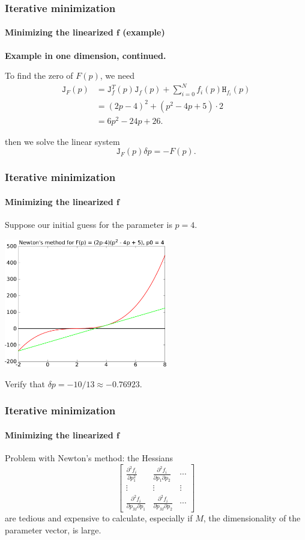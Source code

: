 \documentclass[aspectratio=169]{beamer}
\renewcommand{\vec}[1]{\boldsymbol{#1}}
\newcommand{\mat}[1]{\mathtt{#1}}
\begin{document}
\begin{frame}
\frametitle{Iterative minimization}
\framesubtitle{Minimizing the linearized $\vec{f}$ (example)}

\textbf{Example in one dimension, continued.}

\medskip

To find the zero of $F(p)$, we need
\begin{align*}
\mat{J}_F(p) & = \mat{J}^T_f(p)\mat{J}_f(p) +
                     \sum_{i=0}^N f_i(p)\mat{H}_{f_i}(p) \\
             & = (2p-4)^2 + (p^2-4p+5)\cdot 2 \\
             & = 6p^2-24p+26 .
\end{align*}

then we solve the linear system
$$ \mat{J}_F(p) \delta p = -F(p) .$$

\end{frame}


\begin{frame}
\frametitle{Iterative minimization}
\framesubtitle{Minimizing the linearized $\vec{f}$}

Suppose our initial guess for the parameter is $p = 4$.

\bigskip

\centerline{\includegraphics[width=2.8in]{fig1}}

\bigskip

Verify that $\delta p = -10/13 \approx -0.76923$.

\end{frame}


\begin{frame}
\frametitle{Iterative minimization}
\framesubtitle{Minimizing the linearized $\vec{f}$}

Problem with Newton's method: the Hessians
\begin{equation*}
\begin{bmatrix}
\frac{\partial^2 f_i}{\partial p_1^2} &
\frac{\partial^2 f_i}{\partial p_1 \partial p_2} & \cdots \\
\vdots & \vdots & \vdots \\
\frac{\partial^2 f_i}{\partial p_M \partial p_1} &
\frac{\partial^2 f_i}{\partial p_M \partial p_2} & \cdots
\end{bmatrix}
\end{equation*}
are tedious and expensive to calculate, especially if $M$, the
dimensionality of the parameter vector, is large.

\end{frame}
\end{document}
